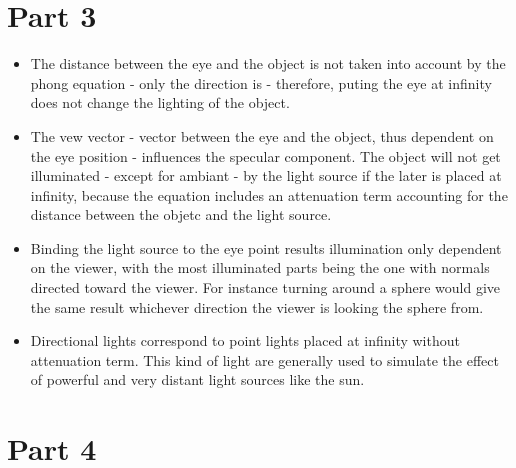 \section{Part 3}
\begin{itemize}
    \item The distance between the eye and the object is not taken into account by the phong
    equation - only the direction is - therefore, puting the eye at infinity does not
    change the lighting of the object.
    \item The vew vector - vector between the eye and the object, thus dependent on the
    eye position - influences the specular component.
    The object will not get illuminated - except for ambiant - by the light source if the later is placed at
    infinity, because the equation includes an attenuation term accounting for the
    distance between the objetc and the light source.
    \item Binding the light source to the eye point results illumination only dependent on
    the viewer, with the most illuminated parts being the one with normals directed
    toward the viewer. For instance turning around a sphere would give the same
    result whichever direction the viewer is looking the sphere from.
    \item Directional lights correspond to point lights placed at infinity without attenuation
    term. This kind of light are generally used to simulate the effect of powerful
    and very distant light sources like the sun.
\end{itemize}
\section{Part 4}


